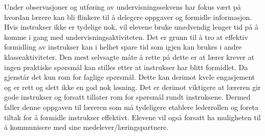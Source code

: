\documentclass[main.tex]{subfiles}
\begin{document}
Under observasjoner og utføring av undervisningssekvens har fokus vært på hvordan lærere kan bli 
flinkere til å delegere oppgaver og formidle informasjon. Hvis instrukser ikke er tydelige nok, vil 
elevene bruke unødvendig lenger tid på å komme i gang med undervisningsaktiviteten. Det er grunn 
til å tro at effektiv formidling av instrukser kan i helhet spare tid som igjen kan brukes i andre 
klasseaktiviteter. Den mest selvsagte måte å rette på dette er at lærer krever at ingen praktiske
spørsmål kan stilles etter at instrukser har blitt formidlet. Da gjenstår det kun rom for faglige 
spørsmål. Dette kan derimot kvele engasjement og er rett og slett ikke en god nok løsning. Det er 
derimot viktigere at læreren gir gode instrukser og forsatt tillater rom for spørsmål rundt 
instruksene. Dermed faller denne oppgaven til læreren som må tydeligere etablere lederrollen og 
foreta tiltak for å formidle instrukser effektivt. Elevene vil også forsatt ha muligheten til å 
kommunisere med sine medelever/læringspartnere.
\end{document}
